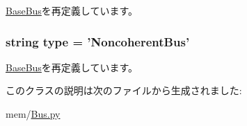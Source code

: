 \hyperlink{classBus_1_1BaseBus_a17da7064bc5c518791f0c891eff05fda}{BaseBus}を再定義しています。\hypertarget{classBus_1_1NoncoherentBus_acce15679d830831b0bbe8ebc2a60b2ca}{
\subsubsection[{type}]{\setlength{\rightskip}{0pt plus 5cm}string {\bf type} = '{\bf NoncoherentBus}'}}
\label{classBus_1_1NoncoherentBus_acce15679d830831b0bbe8ebc2a60b2ca}


\hyperlink{classBus_1_1BaseBus_acce15679d830831b0bbe8ebc2a60b2ca}{BaseBus}を再定義しています。

このクラスの説明は次のファイルから生成されました:\begin{DoxyCompactItemize}
\item 
mem/\hyperlink{Bus_8py}{Bus.py}\end{DoxyCompactItemize}
